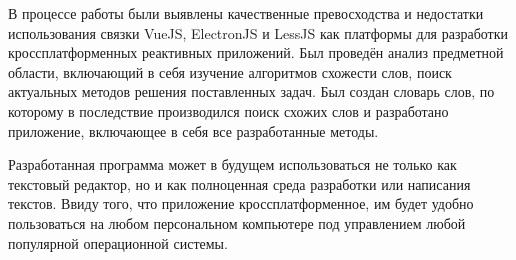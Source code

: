\conclusion

В процессе работы были выявлены качественные превосходства и недостатки использования связки VueJS, ElectronJS и LessJS как платформы для разработки кроссплатформенных реактивных приложений. Был проведён анализ предметной области, включающий в себя изучение алгоритмов схожести слов, поиск актуальных методов решения поставленных задач. Был создан словарь слов, по которому в последствие производился поиск схожих слов и разработано приложение, включающее в себя все разработанные методы.

Разработанная программа может в будущем использоваться не только как текстовый редактор, но и как полноценная среда разработки или написания текстов. Ввиду того, что приложение кроссплатформенное, им будет удобно пользоваться на любом персональном компьютере под управлением любой популярной операционной системы.